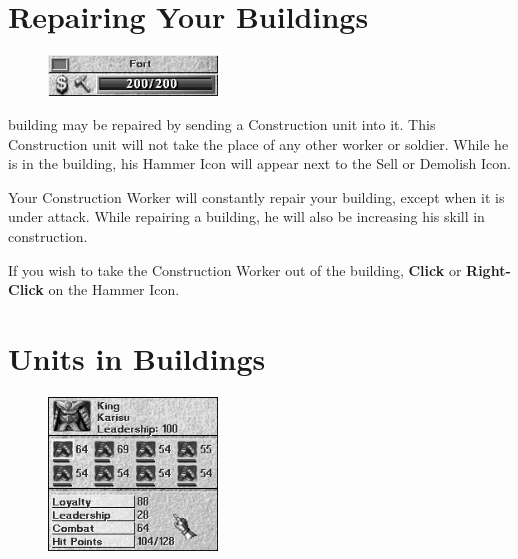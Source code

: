 \section{\textsf{Repairing Your Buildings}}

    
\begin{figure}
    \vspace{-20pt}
    \begin{center}
        \includegraphics[width=0.4\textwidth]{Irepair_building}
    \end{center}
    \vspace{-10pt} %
\end{figure}


 building may be repaired by sending a Construction unit into it. This Construction unit will not take the place of any other worker or soldier. While he is in the building, his Hammer Icon will appear next to the Sell or Demolish Icon.

Your Construction Worker will constantly repair your building, except when it is under attack. While repairing a building, he will also be increasing his skill in construction.

If you wish to take the Construction Worker out of the building, \textbf{Click} or \textbf{Right-Click} on the Hammer Icon.

\section{\textsf{Units in Buildings}}


\begin{figure}
    \vspace{-20pt}
    \begin{center}
        \includegraphics[width=0.4\textwidth]{Ifullfort} %
    \end{center}
    \vspace{-10pt}
\end{figure}

